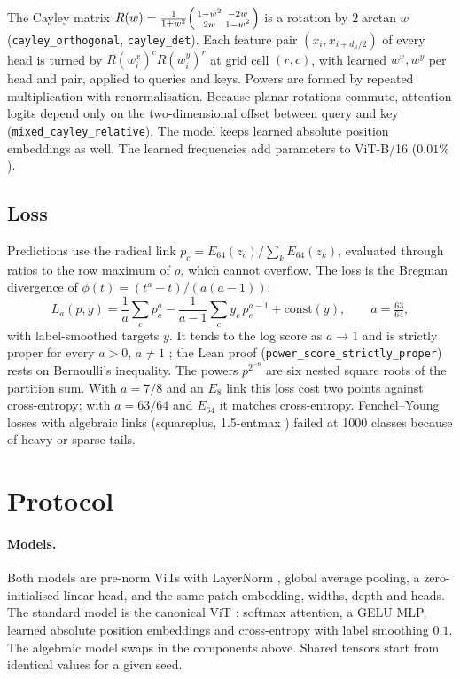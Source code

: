 \documentclass[10pt]{article}
\newcommand{\lean}[1]{\texttt{\small #1}}
\begin{document}
The Cayley matrix $R(w)=\frac{1}{1+w^2}\begin{psmallmatrix}1-w^2 & -2w\\ 2w &
1-w^2\end{psmallmatrix}$ is a rotation by $2\arctan w$
(\lean{cayley\_orthogonal}, \lean{cayley\_det}). Each feature pair
$(x_i,x_{i+d_h/2})$ of every head is turned by $R(w^{x}_i)^{c}R(w^{y}_i)^{r}$
at grid cell $(r,c)$, with learned $w^x,w^y$ per head and pair, applied to
queries and keys. Powers are formed by repeated multiplication with
renormalisation. Because planar rotations commute, attention logits depend
only on the two-dimensional offset between query and key
(\lean{mixed\_cayley\_relative}). The model keeps learned absolute position
embeddings as well. The learned frequencies add \cayleyParams{} parameters
to ViT-B/16 ($0.01\%$).

\subsection{Loss}

Predictions use the radical link $p_c=E_{64}(z_c)/\sum_k E_{64}(z_k)$,
evaluated through ratios to the row maximum of $\rho$, which cannot overflow.
The loss is the Bregman divergence of $\phi(t)=(t^a-t)/(a(a-1))$:
\begin{equation}
L_a(p,y)=\frac{1}{a}\sum_c p_c^{a}-\frac{1}{a-1}\sum_c y_c\,p_c^{a-1}
+\mathrm{const}(y),\qquad a=\tfrac{63}{64},
\end{equation}
with label-smoothed targets $y$. It tends to the log score as $a\to 1$ and is
strictly proper for every $a>0$, $a\neq1$ \cite{gneiting2007scoring}; the
Lean proof (\lean{power\_score\_strictly\_proper}) rests on Bernoulli's
inequality. The powers $p^{2^{-6}}$ are six nested square roots of the
partition sum. With
$a=7/8$ and an $E_8$ link this loss cost two points against cross-entropy;
with $a=63/64$ and $E_{64}$ it matches cross-entropy. Fenchel--Young losses
\cite{blondel2020fy} with algebraic links (squareplus, 1.5-entmax
\cite{peters2019entmax}) failed at 1000 classes because of heavy or sparse
tails.

\section{Protocol}
\label{sec:protocol}

\paragraph{Models.} Both models are pre-norm ViTs with LayerNorm
\cite{ba2016layernorm}, global average pooling, a zero-initialised linear
head, and the same patch embedding, widths, depth and heads. The standard
model is the canonical ViT \cite{dosovitskiy2021vit,beyer2022plain}: softmax
attention, a GELU MLP, learned absolute position embeddings and
cross-entropy with label smoothing $0.1$. The algebraic model swaps in the
components above. Shared tensors start from identical values for a given
seed.
\end{document}
